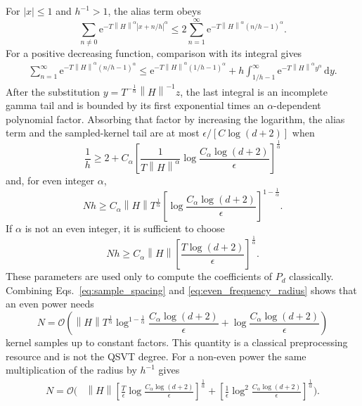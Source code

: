 \documentclass[aps,pra,reprint,floatfix,unsortedaddress,superscriptaddress]{revtex4-2}
\newcommand{\norm}[1]{\left\lVert#1\right\rVert}
\newcommand{\abs}[1]{\left\lvert#1\right\rvert}
\newcommand{\Ocal}{\mathcal{O}}
\begin{document}
For $\abs{x}\leq1$ and $h^{-1}>1$, the alias term obeys
\begin{equation}
    \sum_{n\ne0}
    \mathrm e^{-T\norm{H}^{\alpha}\abs{x+n/h}^{\alpha}}
    \leq
    2\sum_{n=1}^{\infty}
    \mathrm e^{-T\norm{H}^{\alpha}(n/h-1)^\alpha}.
    \label{eq:alias_bound}
\end{equation}
For a positive decreasing function, comparison with its integral gives
\begin{align}
\sum_{n=1}^{\infty}
\mathrm e^{-T\norm{H}^{\alpha}(n/h-1)^\alpha}
\leq
\mathrm e^{-T\norm{H}^{\alpha}(1/h-1)^\alpha}
\nonumber+h\int_{1/h-1}^{\infty}
\mathrm e^{-T\norm{H}^{\alpha}y^\alpha}\,\mathrm dy.
\label{eq:alias_integral_comparison}
\end{align}
After the substitution
$y=T^{-\frac{1}{\alpha}}\norm{H}^{-1}z$, the last integral is an incomplete
gamma tail and is bounded by its first exponential times an
$\alpha$-dependent polynomial factor.  Absorbing that factor by
increasing the logarithm, the alias term and the sampled-kernel tail
are at most $\epsilon/[C\log(d+2)]$ when
\begin{equation}
    \frac{1}{h}
    \geq
    2+
    C_\alpha
    \left[
    \frac{1}{T\norm{H}^{\alpha}}
    \log\frac{C_\alpha\log(d+2)}{\epsilon}
    \right]^{\frac{1}{\alpha}}
    \label{eq:sample_spacing}
\end{equation}
and, for even integer $\alpha$,
\begin{equation}
    Nh
    \geq
    C_\alpha\norm{H}T^{\frac{1}{\alpha}}
    \left[
    \log\frac{C_\alpha\log(d+2)}{\epsilon}
    \right]^{1-\frac{1}{\alpha}}.
    \label{eq:even_frequency_radius}
\end{equation}
If $\alpha$ is not an even integer, it is sufficient to choose
\begin{equation}
    Nh
    \geq
    C_\alpha\norm{H}
    \left[
    \frac{T\log(d+2)}{\epsilon}
    \right]^{\frac{1}{\alpha}}.
    \label{eq:noneven_frequency_radius}
\end{equation}
These parameters are used only to compute the coefficients of $P_d$
classically.  Combining Eqs.~\eqref{eq:sample_spacing} and
\eqref{eq:even_frequency_radius} shows that an even power needs
\begin{equation}
N=\Ocal\!\left(
\norm{H}T^{\frac{1}{\alpha}}
\log^{1-\frac{1}{\alpha}}\frac{C_\alpha\log(d+2)}{\epsilon}
+\log\frac{C_\alpha\log(d+2)}{\epsilon}
\right)
\label{eq:even_classical_samples}
\end{equation}
kernel samples up to constant factors.  This quantity is a classical
preprocessing resource and is not the QSVT degree.
For a non-even power the same multiplication of the radius by
$h^{-1}$ gives
\begin{align}
N=\Ocal\!\Bigg(&
\norm{H}\left[
\frac{T}{\epsilon}
\log\frac{C_\alpha\log(d+2)}{\epsilon}
\right]^{\frac{1}{\alpha}}
+\left[
\frac{1}{\epsilon}
\log^2\frac{C_\alpha\log(d+2)}{\epsilon}
\right]^{\frac{1}{\alpha}}\Bigg).
\label{eq:noneven_classical_samples}
\end{align}
\end{document}
